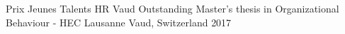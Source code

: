\begin{cvhonors}
  \cvhonor
    {Prix Jeunes Talents HR Vaud}
    {Outstanding Master's thesis in Organizational Behaviour - HEC Lausanne}
    {Vaud, Switzerland}
    {2017}
\end{cvhonors}
